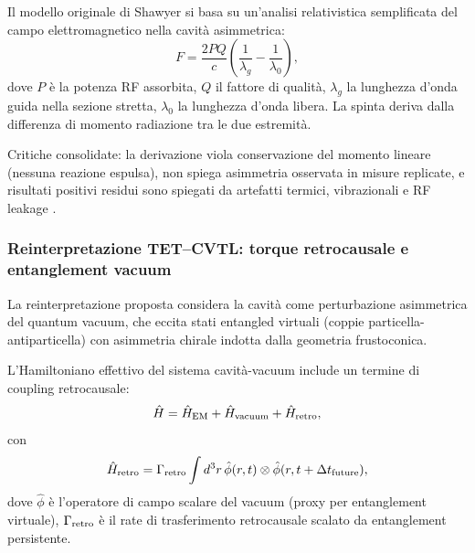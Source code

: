 \documentclass[11pt,a4paper]{article}
\let\oldcite\cite
\renewcommand{\cite}{\protect\oldcite}
\theoremstyle{plain}
\theoremstyle{definition}
\begin{document}
Il modello originale di Shawyer si basa su un’analisi relativistica semplificata del campo elettromagnetico nella cavità asimmetrica:
\begin{equation}
    F = \frac{2 P Q}{c} \left( \frac{1}{\lambda_g} - \frac{1}{\lambda_0} \right),
    \label{eq:shawyer_thrust}
\end{equation}
dove $P$ è la potenza RF assorbita, $Q$ il fattore di qualità, $\lambda_g$ la lunghezza d'onda guida nella sezione stretta, $\lambda_0$ la lunghezza d'onda libera. La spinta deriva dalla differenza di momento radiazione tra le due estremità.

\vspace{0.3cm}

Critiche consolidate: la derivazione viola conservazione del momento lineare (nessuna reazione espulsa), non spiega asimmetria osservata in misure replicate, e risultati positivi residui sono spiegati da artefatti termici, vibrazionali e RF leakage \cite{Tajmar2021AIAA, Tajmar2022}.

\subsubsection{Reinterpretazione TET–CVTL: torque retrocausale e entanglement vacuum}

La reinterpretazione proposta considera la cavità come perturbazione asimmetrica del quantum vacuum, che eccita stati entangled virtuali (coppie particella-antiparticella) con asimmetria chirale indotta dalla geometria frustoconica.

\vspace{0.2cm}

L’Hamiltoniano effettivo del sistema cavità-vacuum include un termine di coupling retrocausale:
\begin{equation}
    \hat{H} = \hat{H}_{\rm EM} + \hat{H}_{\rm vacuum} + \hat{H}_{\rm retro},
    \label{eq:H_total_retro}
\end{equation}
con
\begin{equation}
    \hat{H}_{\rm retro} = \Gamma_{\rm retro} \int d^3r \, \hat{\phi}(r,t) \otimes \hat{\phi}(r,t+\Delta t_{\rm future}),
    \label{eq:H_retro}
\end{equation}
dove $\hat{\phi}$ è l’operatore di campo scalare del vacuum (proxy per entanglement virtuale), $\Gamma_{\rm retro}$ è il rate di trasferimento retrocausale scalato da entanglement persistente.

\vspace{0.2cm}
\end{document}
